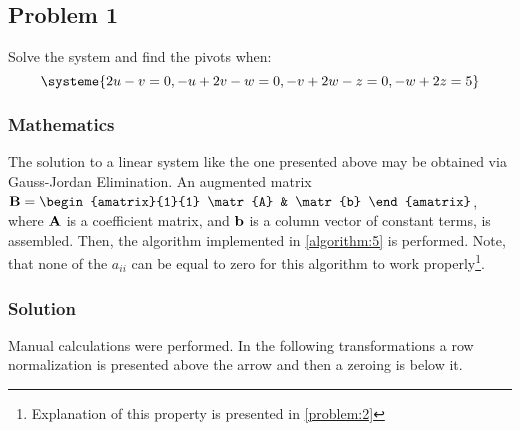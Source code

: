 \subsection{Problem 1}

Solve the system and find the pivots when:
\begin{equation*}
    \systeme{2u-v=0,-u+2v-w=0,-v+2w-z=0,-w+2z=5}
\end{equation*}

\subsubsection*{Mathematics}
The solution to a linear system like the one presented above may be obtained via Gauss-Jordan Elimination. An augmented
matrix
$\matr{B} = \begin{amatrix}{1}{1}
    \matr{A} & \matr{b}
\end{amatrix}$, where $\mathbf{A}$ is a coefficient matrix, and $\mathbf{b}$ is a
column vector of constant terms, is assembled. Then, the algorithm implemented
in \ref{algorithm:5} is performed. Note, that none of the $a_{ii}$ can be equal
to zero for this algorithm to work properly\footnote{Explanation of this
property is presented in \ref{problem:2}}.

\subsubsection*{Solution}

Manual calculations were performed. In the following transformations a row
normalization is presented above the arrow and then a zeroing is below it.

